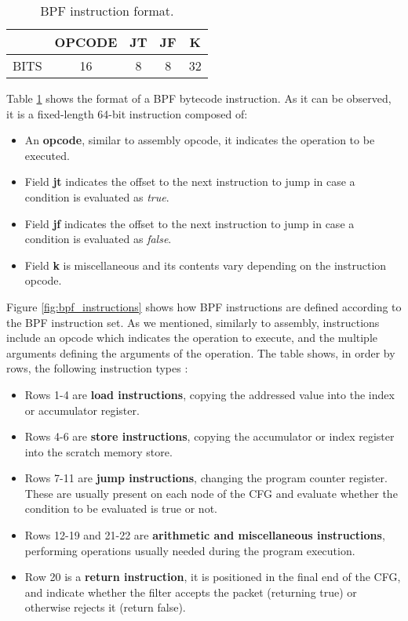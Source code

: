 \begin{table}[htbp]
\begin{tabular}{|c|c|c|c|c|}
\hline
& OPCODE & JT & JF & K\\
\hline
BITS & 16 & 8 & 8 & 32\\
\hline
\end{tabular}
\caption{BPF instruction format.}
\label{table:bpf_inst_format}
\end{table}

Table \ref{table:bpf_inst_format} shows the format of a BPF bytecode instruction. As it can be observed, it is a fixed-length 64-bit instruction composed of:
\begin{itemize}
\item An \textbf{opcode}, similar to assembly opcode, it indicates the operation to be executed.
\item Field \textbf{jt} indicates the offset to the next instruction to jump in case a condition is evaluated as \textit{true}.
\item Field \textbf{jf} indicates the offset to the next instruction to jump in case a condition is evaluated as \textit{false}.
\item Field \textbf{k} is miscellaneous and its contents vary depending on the instruction opcode.
\end{itemize}

Figure \ref{fig:bpf_instructions} shows how BPF instructions are defined according to the BPF instruction set. As we mentioned, similarly to assembly, instructions include an opcode which indicates the operation to execute, and the multiple arguments defining the arguments of the operation. The table shows, in order by rows, the following instruction types \cite{bpf_bsd_origin_bpf_page8}:
\begin{itemize}
\item Rows 1-4 are \textbf{load instructions}, copying the addressed value into the index or accumulator register.
\item Rows 4-6 are \textbf{store instructions}, copying the accumulator or index register into the scratch memory store.
\item Rows 7-11 are \textbf{jump instructions}, changing the program counter register. These are usually present on each node of the CFG and evaluate whether the condition to be evaluated is true or not.
\item Rows 12-19 and 21-22 are \textbf{arithmetic and miscellaneous instructions}, performing operations usually needed during the program execution.
\item Row 20 is a \textbf{return instruction}, it is positioned in the final end of the CFG, and indicate whether the filter accepts the packet (returning true) or otherwise rejects it (return false).
\end{itemize}

